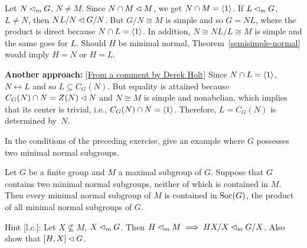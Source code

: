 \begin{solution} Let $N\lhd_mG$, $N\ne M$. Since $N\cap M\lhd M$, we get $N\cap M=\langle1\rangle$. If $L\lhd_mG$, $L\ne N$, then $NL/N\lhd G/N$. But $G/N\cong M$ is simple and so $G=NL$, where the product is direct because $N\cap L=\langle1\rangle$. In addition, $N\cong NL/L\cong M$ is simple and the same goes for $L$. Should $H$ be minimal normal, Theorem~\ref{semisimple-normal} would imply $H=N$ or $H=L$. 

{\small \textbf{Another approach:} [\href{https://math.stackexchange.com/a/1188536/269050}{From a comment by Derek Holt}] Since $N\cap L=\langle1\rangle$, $N\leftrightarrow L$ and so $L\subseteq C_G(N)$. But equality is attained because $C_G(N)\cap N=Z(N)\lhd N$ and $N\cong M$ is simple and nonabelian, which implies that its center is trivial, i.e., $C_G(N)\cap N=\langle1\rangle$. Therefore, $L=C_G(N)$ is determined by~$N$.}

 \end{solution}

\begin{exr}
    In the conditions of the preceding exercise, give an example where\/ $G$ possesses two minimal normal subgroups.
\end{exr}


\begin{exr}
    Let\/ $G$ be a finite group and\/ $M$ a maximal subgroup of\/ $G$. Suppose that\/ $G$ contains two minimal normal subgroups, neither of which is contained in\/ $M$. Then every minimal normal subgroup of\/ $M$ is contained in\/ ${\rm Soc}(G)$, the product of all minimal normal subgroups of\/ $G$.

    \textrm{\upshape Hint [l.c.]: Let $X\not\subseteq M$, $X\lhd_m G$. Then $H\lhd_m M\implies HX/X\lhd_mG/X$. Also show that $[H,X]\lhd G$.}
\end{exr}

